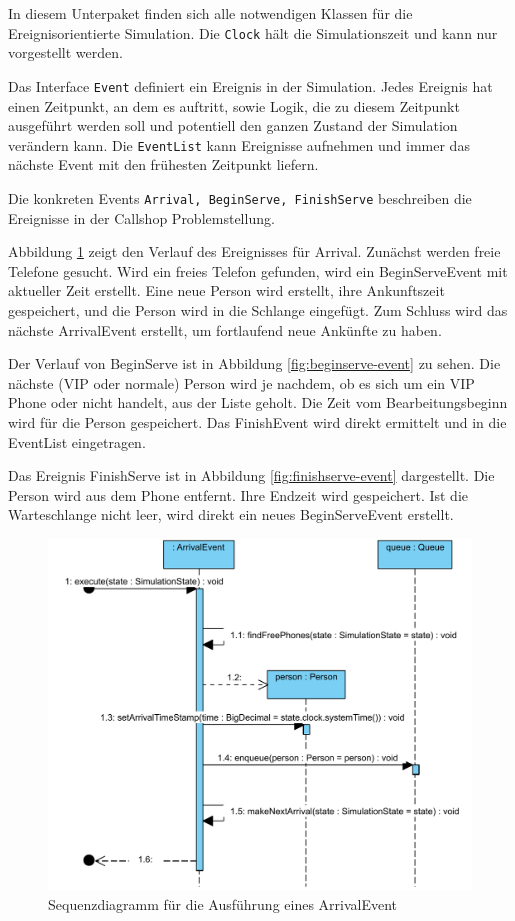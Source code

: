 In diesem Unterpaket finden sich alle notwendigen Klassen für die Ereignisorientierte Simulation. Die \texttt{Clock} hält die Simulationszeit und kann nur vorgestellt werden.

Das Interface \texttt{Event} definiert ein Ereignis in der Simulation. Jedes Ereignis hat einen Zeitpunkt, an dem es auftritt, sowie Logik, die zu diesem Zeitpunkt ausgeführt werden soll und potentiell den ganzen Zustand der Simulation verändern kann. Die \texttt{EventList} kann Ereignisse aufnehmen und immer das nächste Event mit den frühesten Zeitpunkt liefern.

Die konkreten Events \texttt{Arrival, BeginServe, FinishServe} beschreiben die Ereignisse in der Callshop Problemstellung.

Abbildung \ref{fig:arrival-event} zeigt den Verlauf des Ereignisses für Arrival. Zunächst werden freie Telefone gesucht. Wird ein freies Telefon gefunden, wird ein BeginServeEvent mit aktueller Zeit erstellt. Eine neue Person wird erstellt, ihre Ankunftszeit gespeichert, und die Person wird in die Schlange eingefügt. Zum Schluss wird das nächste ArrivalEvent erstellt, um fortlaufend neue Ankünfte zu haben.

Der Verlauf von BeginServe ist in Abbildung \ref{fig:beginserve-event} zu sehen. Die nächste (VIP oder normale) Person wird je nachdem, ob es sich um ein VIP Phone oder nicht handelt, aus der Liste geholt. Die Zeit vom Bearbeitungsbeginn wird für die Person gespeichert. Das FinishEvent wird direkt ermittelt und in die EventList eingetragen.

Das Ereignis FinishServe ist in Abbildung \ref{fig:finishserve-event} dargestellt. Die Person wird aus dem Phone entfernt. Ihre Endzeit wird gespeichert. Ist die Warteschlange nicht leer, wird direkt ein neues BeginServeEvent erstellt.


\begin{figure}[ht]
	\centering
	\includegraphics[scale=0.5]{abbildungen/uml/Arrival.pdf}
	\caption{Sequenzdiagramm für die Ausführung eines ArrivalEvent}
	\label{fig:arrival-event}
\end{figure}

